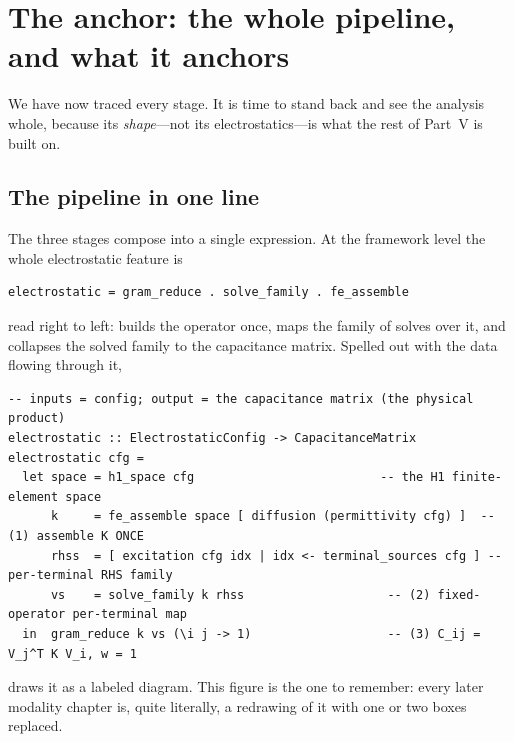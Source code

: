 \section{The anchor: the whole pipeline, and what it anchors}
\label{sec:es-anchor}

We have now traced every stage. It is time to stand back and see the analysis
whole, because its \emph{shape}---not its electrostatics---is what the rest of
Part~V is built on.

\subsection{The pipeline in one line}

The three stages compose into a single expression. At the framework level the whole
electrostatic feature is
\begin{lstlisting}[style=l4style]
electrostatic = gram_reduce . solve_family . fe_assemble
\end{lstlisting}
read right to left:  builds the operator once, 
maps the family of solves over it, and  collapses the solved
family to the capacitance matrix. Spelled out with the data flowing through it,
\begin{lstlisting}[style=l4style]
-- inputs = config; output = the capacitance matrix (the physical product)
electrostatic :: ElectrostaticConfig -> CapacitanceMatrix
electrostatic cfg =
  let space = h1_space cfg                          -- the H1 finite-element space
      k     = fe_assemble space [ diffusion (permittivity cfg) ]  -- (1) assemble K ONCE
      rhss  = [ excitation cfg idx | idx <- terminal_sources cfg ] -- per-terminal RHS family
      vs    = solve_family k rhss                    -- (2) fixed-operator per-terminal map
  in  gram_reduce k vs (\i j -> 1)                   -- (3) C_ij = V_j^T K V_i, w = 1
\end{lstlisting}
 draws it as a labeled diagram. This figure is the one to
remember: every later modality chapter is, quite literally, a redrawing of it with
one or two boxes replaced.

